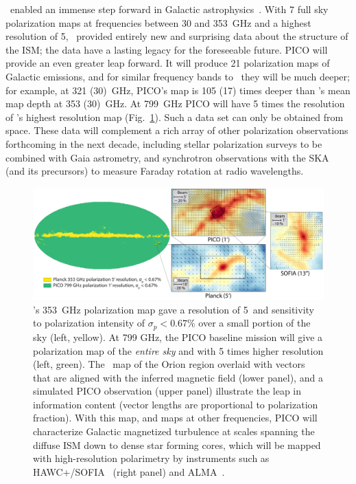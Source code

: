 \documentclass[PICOReport.tex]{subfiles}
\begin{document}
\planck\ enabled an immense step forward in Galactic astrophysics~\citep{Planck2018:XII}. With 7 full sky polarization maps at frequencies between 30 and 353~GHz and a highest resolution of 5\arcmin, \planck\ provided entirely new and surprising data about the structure of the \ac{ISM}; the data have a lasting legacy for the foreseeable future. PICO will provide an even greater leap forward. It will produce 21 polarization maps of Galactic emissions, and for similar frequency bands to \planck\ they will be much deeper; for example, at 321 (30)~GHz, PICO's map is 105 (17) times deeper than \planck's mean map depth at 353 (30)~GHz.  At 799~GHz PICO will have 5 times the resolution of \planck 's highest resolution map (Fig.~\ref{fig:allsky}). Such a data set can only be obtained from space. These data will complement a rich array of other polarization observations forthcoming in the next decade, including stellar polarization surveys to be combined with Gaia astrometry, and synchrotron observations with the SKA (and its precursors) to measure Faraday rotation at radio wavelengths.
\begin{figure}[ht]
    \centering
    \includegraphics[width=6.5in]{galsci_fig_v4.pdf}
\vspace{-0.25in}
    \caption{\captiontext  \planck 's 353~GHz polarization map gave a resolution of 5\arcmin~and sensitivity to polarization intensity of $\sigma_{p} < 0.67\%$ over a small portion of the sky (left, yellow).  At 799 GHz, the PICO baseline mission will give a polarization map of the {\it entire sky} and with 5 times higher resolution (left, green). The \planck~map of the Orion region overlaid with vectors that are aligned with the inferred magnetic field (lower panel), and a simulated PICO observation (upper panel) illustrate the leap in information content (vector lengths are proportional to polarization fraction). With this map, and maps at other frequencies, PICO will characterize Galactic magnetized turbulence at scales spanning the diffuse ISM down to dense star forming cores, which will be mapped with high-resolution polarimetry by instruments such as HAWC+/SOFIA~\citep{Chuss2018} (right panel) and ALMA~\citep{Bacciotti2018ApJ}.
    \label{fig:allsky} }
\vspace{-0.10in}
\end{figure}
\end{document}
